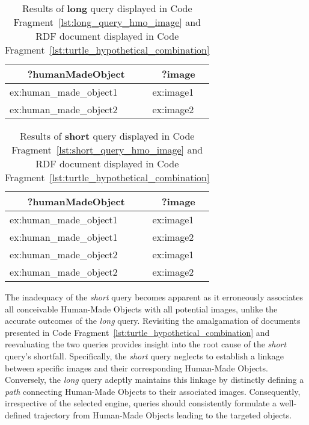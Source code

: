 \begin{table}[htbp]
    \centering
    \caption{Results of \textbf{long} query displayed in Code Fragment~\ref{lst:long_query_hmo_image} and RDF document displayed in Code Fragment~\ref{lst:turtle_hypothetical_combination}}
    \label{tab:results_long_query}
    \begin{tabular}{ll}
        \toprule
        \multicolumn{1}{c}{?humanMadeObject} & \multicolumn{1}{c}{?image} \\
        \midrule
        ex:human\_made\_object1 & ex:image1\\
        ex:human\_made\_object2 & ex:image2\\
        \bottomrule
    \end{tabular}
\end{table}

\begin{table}[htbp]
    \centering
    \caption{Results of \textbf{short} query displayed in Code Fragment~\ref{lst:short_query_hmo_image} and RDF document displayed in Code Fragment~\ref{lst:turtle_hypothetical_combination}}
    \label{tab:results_short_query}
    \begin{tabular}{ll}
        \toprule
        \multicolumn{1}{c}{?humanMadeObject} & \multicolumn{1}{c}{?image} \\
        \midrule
        ex:human\_made\_object1 & ex:image1\\
        ex:human\_made\_object1 & ex:image2\\
        ex:human\_made\_object2 & ex:image1\\
        ex:human\_made\_object2 & ex:image2\\
        \bottomrule
    \end{tabular}
\end{table}

The inadequacy of the \textit{short} query becomes apparent as it erroneously associates all conceivable Human-Made Objects with all potential images, unlike the accurate outcomes of the \textit{long} query. Revisiting the amalgamation of documents presented in Code Fragment~\ref{lst:turtle_hypothetical_combination} and reevaluating the two queries provides insight into the root cause of the \textit{short} query's shortfall. Specifically, the \textit{short} query neglects to establish a linkage between specific images and their corresponding Human-Made Objects. Conversely, the \textit{long} query adeptly maintains this linkage by distinctly defining a \textit{path} connecting Human-Made Objects to their associated images. Consequently, irrespective of the selected engine, queries should consistently formulate a well-defined trajectory from Human-Made Objects leading to the targeted objects.

